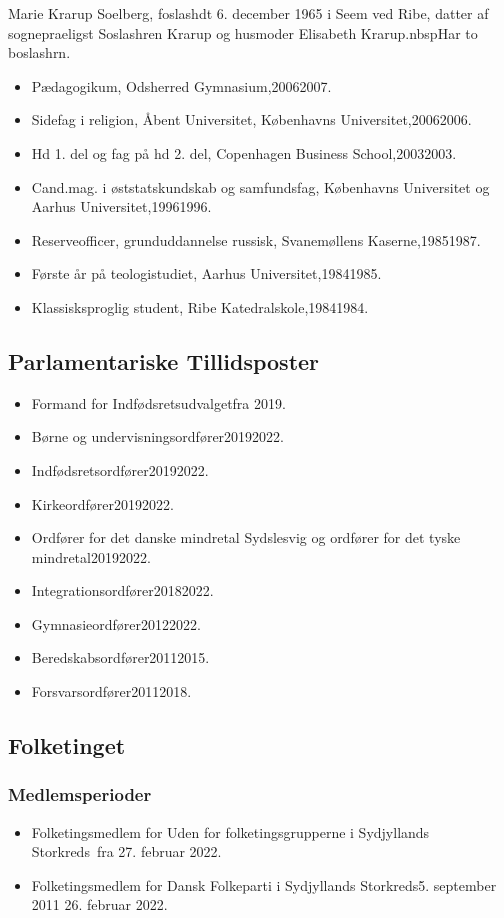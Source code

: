 \documentclass[11pt, a4paper]{awesome-cv}
\begin{document}
\makecvheader[R]
\makelettertitle
\begin{cvletter}
Marie Krarup Soelberg, foslashdt 6. december 1965 i Seem ved Ribe, datter af sognepraeligst Soslashren Krarup og husmoder Elisabeth Krarup.nbspHar to boslashrn.

\begin{itemize}
\item Pædagogikum, Odsherred Gymnasium,20062007.
\item Sidefag i religion, Åbent Universitet, Københavns Universitet,20062006.
\item Hd 1. del og fag på hd 2. del, Copenhagen Business School,20032003.
\item Cand.mag. i øststatskundskab og samfundsfag, Københavns Universitet og Aarhus Universitet,19961996.
\item Reserveofficer, grunduddannelse russisk, Svanemøllens Kaserne,19851987.
\item Første år på teologistudiet, Aarhus Universitet,19841985.
\item Klassisksproglig student, Ribe Katedralskole,19841984.
\end{itemize}
\subsection*{Parlamentariske Tillidsposter}
\begin{itemize}
\item Formand for Indfødsretsudvalgetfra 2019.
\item Børne og undervisningsordfører20192022.
\item Indfødsretsordfører20192022.
\item Kirkeordfører20192022.
\item Ordfører for det danske mindretal Sydslesvig og ordfører for det tyske mindretal20192022.
\item Integrationsordfører20182022.
\item Gymnasieordfører20122022.
\item Beredskabsordfører20112015.
\item Forsvarsordfører20112018.
\end{itemize}
\subsection*{Folketinget}
\subsubsection*{Medlemsperioder}
\begin{itemize}
\item Folketingsmedlem for Uden for folketingsgrupperne i Sydjyllands Storkreds fra 27. februar 2022.
\item Folketingsmedlem for Dansk Folkeparti i Sydjyllands Storkreds5. september 2011  26. februar 2022.
\end{itemize}

\end{cvletter}
\end{document}
